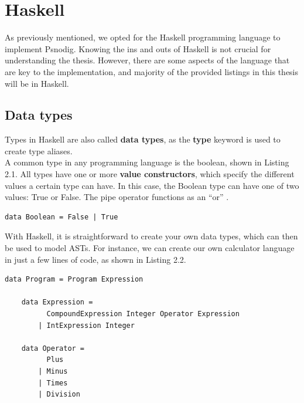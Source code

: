 \section{Haskell}

As previously mentioned, we opted for the Haskell programming language to implement Psnodig. Knowing the ins and outs of Haskell is not crucial for understanding the thesis. However, there are some aspects of the language that are key to the implementation, and majority of the provided listings in this thesis will be in Haskell. \hfill \\

\subsection{Data types}

Types in Haskell are also called \textbf{data types}, as the \textbf{type} keyword is used to create type aliases. \hfill \\

A common type in any programming language is the boolean, shown in Listing 2.1. All types have one or more \textbf{value constructors}, which specify the different values a certain type can have. In this case, the Boolean type can have one of two values: True or False. The pipe operator functions as an ``or'' \cite[be stian om å sjekke hvilken side dette eksemplet er på i boka]{LYAH}. \hfill \\

\begin{lstlisting}[caption={Recreating the Boolean data type with Haskell}, captionpos=b, frame=tlrb]
    data Boolean = False | True
\end{lstlisting}

With Haskell, it is straightforward to create your own data types, which can then be used to model ASTs. For instance, we can create our own calculator language in just a few lines of code, as shown in Listing 2.2. \hfill \\

\begin{lstlisting}[caption={Example data types in Haskell}, captionpos=b, frame=tlrb]
    data Program = Program Expression

    data Expression =
          CompoundExpression Integer Operator Expression
        | IntExpression Integer

    data Operator =
          Plus
        | Minus
        | Times
        | Division
\end{lstlisting}


